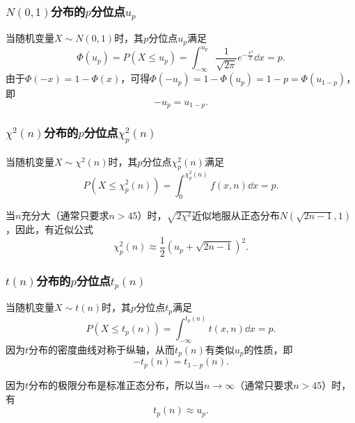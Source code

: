 \subsubsection{\texorpdfstring{\(N(0,1)\)分布的\(p\)分位点\(u_p\)}{标准正态分布的p分位点}}
当随机变量\(X \sim N(0,1)\)时，其\(p\)分位点\(u_p\)满足\begin{equation*}
\Phi(u_p)
= P(X \leq u_p)
= \int_{-\infty}^{u_p} \frac{1}{\sqrt{2\pi}} e^{-\frac{x^2}{2}} \dd{x}
= p.
\end{equation*}由于\(\Phi(-x)=1-\Phi(x)\)，可得\(\Phi(-u_p)=1-\Phi(u_p)=1-p=\Phi(u_{1-p})\)，即\begin{equation}
-u_p=u_{1-p}.
\end{equation}

\subsubsection{\texorpdfstring{\(\chi^2(n)\)分布的\(p\)分位点\(\chi^2_p(n)\)}{卡方分布的p分位点}}
当随机变量\(X \sim \chi^2(n)\)时，其\(p\)分位点\(\chi^2_p(n)\)满足\begin{equation*}
P(X \leq \chi^2_p(n)) = \int_0^{\chi^2_p(n)} f(x,n) \dd{x} = p.
\end{equation*}

当\(n\)充分大（通常只要求\(n>45\)）时，\(\sqrt{2\chi^2}\)近似地服从正态分布\(N(\sqrt{2n-1},1)\)，因此，有近似公式\begin{equation}
\chi^2_p(n) \approx \frac{1}{2}\left(u_p+\sqrt{2n-1}\right)^2.
\end{equation}

\subsubsection{\texorpdfstring{\(t(n)\)分布的\(p\)分位点\(t_p(n)\)}{t分布的p分位点}}
当随机变量\(X \sim t(n)\)时，其\(p\)分位点\(t_p\)满足\begin{equation*}
P(X \leq t_p(n))
= \int_{-\infty}^{t_p(n)} t(x,n) \dd{x} = p.
\end{equation*}因为\(t\)分布的密度曲线对称于纵轴，从而\(t_p(n)\)有类似\(u_p\)的性质，即\begin{equation}
-t_p(n)=t_{1-p}(n).
\end{equation}

因为\(t\)分布的极限分布是标准正态分布，所以当\(n\to\infty\)（通常只要求\(n>45\)）时，有\begin{equation*}
t_p(n) \approx u_p.
\end{equation*}

